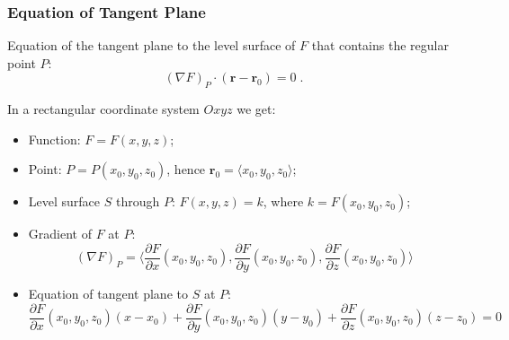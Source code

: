 \begin{frame}
  \frametitle{Equation of Tangent Plane}

Equation of the tangent plane to the level surface of $F$ that contains the regular point $P$:
%
$$(\nabla F)_P \cdot (\textbf{r}-\textbf{r}_0) = 0\; .$$

\pause
In a rectangular coordinate system $Oxyz$ we get:

\begin{itemize}
  \item Function: $F = F(x,y,z)$;
  \item Point: $P=P(x_0,y_0,z_0)$, hence $\textbf{r}_0 = \langle x_0, y_0 , z_0 \rangle$;
  \item Level surface $S$ through $P$: $F(x,y,z) = k$, where $k = F(x_0,y_0,z_0)$;
  \item \pause Gradient of $F$ at $P$:
  $$(\nabla F)_P = \langle \frac{\partial F}{\partial x}(x_0,y_0,z_0), \frac{\partial F}{\partial y}(x_0,y_0,z_0), \frac{\partial F}{\partial z}(x_0,y_0,z_0) \rangle$$
  \item \pause Equation of tangent plane to $S$ at $P$:
  $$\frac{\partial F}{\partial x}(x_0,y_0,z_0)(x-x_0) + \frac{\partial F}{\partial y}(x_0,y_0,z_0) (y-y_0) + \frac{\partial F}{\partial z}(x_0,y_0,z_0)(z-z_0) = 0$$
\end{itemize}
\end{frame}